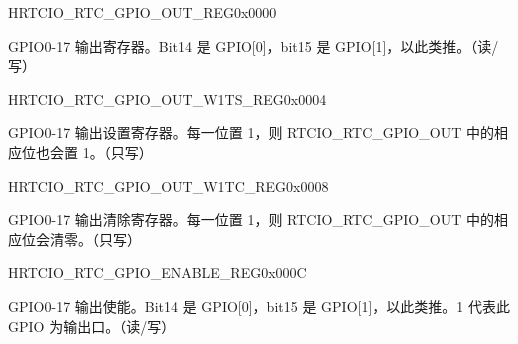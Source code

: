 \begin{register}{H}{RTCIO\_RTC\_GPIO\_OUT\_REG}{0x0000}\label{regdesc:RTCIORTCGPIOOUTREG}
%
%
\regnewline%
\begin{regdesc}\begin{reglist}
\item [RTCIO\_RTC\_GPIO\_OUT\_DATA]GPIO0-17 输出寄存器。Bit14 是 GPIO[0]，bit15 是 GPIO[1]，以此类推。（读/写）
\end{reglist}\end{regdesc}
\end{register}


\begin{register}{H}{RTCIO\_RTC\_GPIO\_OUT\_W1TS\_REG}{0x0004}\label{regdesc:RTCIORTCGPIOOUTW1TSREG}
%
%
\regnewline%
\begin{regdesc}\begin{reglist}
\item [RTCIO\_RTC\_GPIO\_OUT\_DATA\_W1TS]GPIO0-17 输出设置寄存器。每一位置 1，则 RTCIO\_RTC\_GPIO\_OUT 中的相应位也会置 1。（只写）
\end{reglist}\end{regdesc}
\end{register}


\begin{register}{H}{RTCIO\_RTC\_GPIO\_OUT\_W1TC\_REG}{0x0008}\label{regdesc:RTCIORTCGPIOOUTW1TCREG}
%
%
\regnewline%
\begin{regdesc}\begin{reglist}
\item [RTCIO\_RTC\_GPIO\_OUT\_DATA\_W1TC]GPIO0-17 输出清除寄存器。每一位置 1，则 RTCIO\_RTC\_GPIO\_OUT 中的相应位会清零。（只写）
\end{reglist}\end{regdesc}
\end{register}


\begin{register}{H}{RTCIO\_RTC\_GPIO\_ENABLE\_REG}{0x000C}\label{regdesc:RTCIORTCGPIOENABLEREG}
%
%
\regnewline%
\begin{regdesc}\begin{reglist}
\item [RTCIO\_RTC\_GPIO\_ENABLE]GPIO0-17 输出使能。Bit14 是 GPIO[0]，bit15 是 GPIO[1]，以此类推。1 代表此 GPIO 为输出口。（读/写）
\end{reglist}\end{regdesc}
\end{register}


